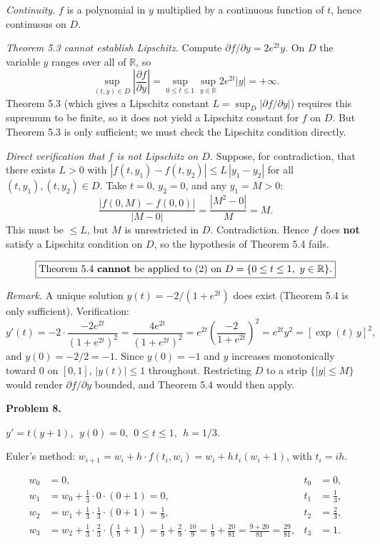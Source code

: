 \documentclass[12pt,letterpaper]{article}
\begin{document}
\textit{Continuity.} $f$ is a polynomial in $y$ multiplied by a continuous function of $t$, hence continuous on $D$. \checkmark

\textit{Theorem 5.3 cannot establish Lipschitz.} Compute $\partial f / \partial y = 2 e^{2t} y$. On $D$ the variable $y$ ranges over all of $\mathbb{R}$, so
\[
\sup_{(t,y) \in D} \left|\frac{\partial f}{\partial y}\right| = \sup_{0 \le t \le 1} \sup_{y \in \mathbb{R}} 2 e^{2t} |y| = +\infty.
\]
Theorem 5.3 (which gives a Lipschitz constant $L = \sup_D |\partial f/\partial y|$) requires this supremum to be finite, so it does not yield a Lipschitz constant for $f$ on $D$. But Theorem 5.3 is only sufficient; we must check the Lipschitz condition directly.

\textit{Direct verification that $f$ is not Lipschitz on $D$.} Suppose, for contradiction, that there exists $L > 0$ with $|f(t, y_1) - f(t, y_2)| \le L\,|y_1 - y_2|$ for all $(t, y_1), (t, y_2) \in D$. Take $t = 0$, $y_2 = 0$, and any $y_1 = M > 0$:
\[
\frac{|f(0, M) - f(0, 0)|}{|M - 0|} = \frac{|M^2 - 0|}{M} = M.
\]
This must be $\le L$, but $M$ is unrestricted in $D$. Contradiction. Hence $f$ does \textbf{not} satisfy a Lipschitz condition on $D$, so the hypothesis of Theorem 5.4 fails.

\[
\boxed{\text{Theorem 5.4 \textbf{cannot} be applied to (2) on } D = \{0 \le t \le 1,\ y \in \mathbb{R}\}.}
\]

\textit{Remark.} A unique solution $y(t) = -2/(1 + e^{2t})$ does exist (Theorem 5.4 is only sufficient). Verification:
\[
y'(t) = -2 \cdot \frac{-2 e^{2t}}{(1 + e^{2t})^2} = \frac{4 e^{2t}}{(1 + e^{2t})^2} = e^{2t}\!\left(\frac{-2}{1 + e^{2t}}\right)^{\!2} = e^{2t} y^2 = [\exp(t)\, y]^2,
\]
and $y(0) = -2/2 = -1$. Since $y(0) = -1$ and $y$ increases monotonically toward $0$ on $[0,1]$, $|y(t)| \le 1$ throughout. Restricting $D$ to a strip $\{|y| \le M\}$ would render $\partial f/\partial y$ bounded, and Theorem 5.4 would then apply.



\textbf{Problem 8.}

$y' = t(y + 1)$, $\;y(0) = 0$, $\;0 \le t \le 1$, $\;h = 1/3$.

Euler's method: $w_{i+1} = w_i + h \cdot f(t_i, w_i) = w_i + h\, t_i (w_i + 1)$, with $t_i = i h$.

\begin{align*}
w_0 &= 0, &t_0 &= 0, \\[3pt]
w_1 &= w_0 + \tfrac{1}{3} \cdot 0 \cdot (0 + 1) = 0, &t_1 &= \tfrac{1}{3}, \\[3pt]
w_2 &= w_1 + \tfrac{1}{3} \cdot \tfrac{1}{3} \cdot (0 + 1) = \tfrac{1}{9}, &t_2 &= \tfrac{2}{3}, \\[3pt]
w_3 &= w_2 + \tfrac{1}{3} \cdot \tfrac{2}{3} \cdot \!\left(\tfrac{1}{9} + 1\right)
     = \tfrac{1}{9} + \tfrac{2}{9} \cdot \tfrac{10}{9}
     = \tfrac{1}{9} + \tfrac{20}{81}
     = \tfrac{9 + 20}{81}
     = \tfrac{29}{81}, &t_3 &= 1.
\end{align*}
\end{document}
